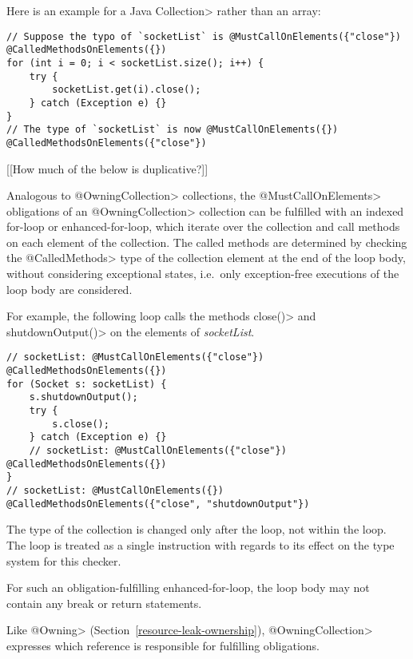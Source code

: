 Here is an example for a Java \<Collection> rather than an array:

\begin{verbatim}
// Suppose the typo of `socketList` is @MustCallOnElements({"close"}) @CalledMethodsOnElements({})
for (int i = 0; i < socketList.size(); i++) {
    try {
        socketList.get(i).close();
    } catch (Exception e) {}
}
// The type of `socketList` is now @MustCallOnElements({}) @CalledMethodsOnElements({"close"})
\end{verbatim}


[[How much of the below is duplicative?]]

Analogous to \<@OwningCollection> collections, the \<@MustCallOnElements>
obligations of an \<@OwningCollection> collection can be fulfilled with an
indexed for-loop or enhanced-for-loop, which iterate over the collection and
call methods on each element of the collection. The called methods are
determined by checking the \<@CalledMethods> type of the collection element at
the end of the loop body, without considering exceptional states, i.e.\ only
exception-free executions of the loop body are considered.

For example, the following loop calls the methods \<close()> and \<shutdownOutput()> on the elements of \textit{socketList}.

\begin{verbatim}
// socketList: @MustCallOnElements({"close"}) @CalledMethodsOnElements({})
for (Socket s: socketList) {
    s.shutdownOutput();
    try {
        s.close();
    } catch (Exception e) {}
    // socketList: @MustCallOnElements({"close"}) @CalledMethodsOnElements({})
}
// socketList: @MustCallOnElements({}) @CalledMethodsOnElements({"close", "shutdownOutput"})
\end{verbatim}

The type of the collection is changed only after the loop, not within the
loop. The loop is treated as a single instruction with regards to its effect on
the type system for this checker.

For such an obligation-fulfilling enhanced-for-loop, the loop body may not
contain any break or return statements.






Like \<@Owning> (Section~\ref{resource-leak-ownership}),
\<@OwningCollection> expresses which reference is responsible for
fulfilling obligations.

